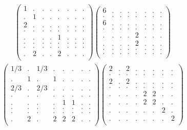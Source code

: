 \documentclass[12pt,a4paper]{amsart}
\begin{document}
\begin{align*}
\left(\begin{array}{rrrrrrrr}%
1&.&.&.&.&.&.&.\\%
.&1&.&.&.&.&.&.\\%
2&.&.&.&.&.&.&.\\%
.&.&.&.&.&.&.&.\\%
.&.&.&.&1&.&.&.\\%
.&.&.&.&.&.&.&.\\%
.&.&.&.&.&.&.&.\\%
.&2&.&.&2&.&.&.\\%
\end{array}\right)%
\left(\begin{array}{rrrrrrrr}%
6&.&.&.&.&.&.&.\\%
.&.&.&.&.&.&.&.\\%
6&.&.&.&.&.&.&.\\%
.&.&.&.&.&.&.&.\\%
.&.&.&.&2&.&.&.\\%
.&.&.&.&2&.&.&.\\%
.&.&.&.&.&.&.&.\\%
.&.&.&.&.&.&.&.\\%
\end{array}\right)%
\end{align*}
\begin{align*}
\left(\begin{array}{rrrrrrrr}%
1/3&.&1/3&.&.&.&.&.\\%
.&1&.&1&.&.&.&.\\%
2/3&.&2/3&.&.&.&.&.\\%
.&.&.&.&.&.&.&.\\%
.&.&.&.&1&1&.&.\\%
.&.&.&.&.&.&.&.\\%
.&.&.&.&.&.&.&.\\%
.&2&.&2&2&2&.&.\\%
\end{array}\right)%
\left(\begin{array}{rrrrrrrr}%
2&.&2&.&.&.&.&.\\%
.&.&.&.&.&.&.&.\\%
2&.&2&.&.&.&.&.\\%
.&.&.&.&.&.&.&.\\%
.&.&.&.&2&2&.&.\\%
.&.&.&.&2&2&.&.\\%
.&.&.&.&.&.&2&.\\%
.&.&.&.&.&.&.&2\\%
\end{array}\right)%
\end{align*}
\end{document}
